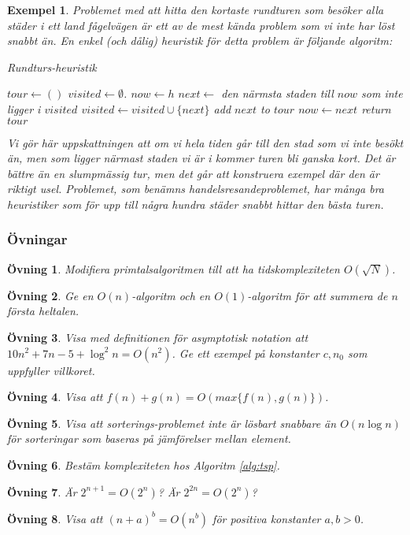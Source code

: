 \documentclass[10pt,a4paper]{article}
\theoremstyle{problem}
\newtheorem{exercise}{Övning}
\newtheorem{example}{Exempel}
\begin{document}
\begin{example}
Problemet med att hitta den kortaste rundturen som besöker alla städer i ett land fågelvägen är ett av de mest kända problem som vi inte har
löst snabbt än. En enkel (och dålig) heuristik för detta problem är följande algoritm:

\begin{algorithm}[H]
\caption{Rundturs-heuristik}\label{alg:tsp}
\begin{algorithmic}[1]
\State $tour \gets ()$
\State $visited \gets \emptyset$.
\State $now \gets h$ 
\State $next \gets $ den närmsta staden till $now$ som inte ligger i $visited$
\State $visited \gets visited\cup \{next\}$
\State add $next$ to $tour$
\State $now \gets next$
\EndWhile
\State return $tour$
\EndProcedure
\end{algorithmic}
\end{algorithm}


Vi gör här uppskattningen att om vi hela tiden går till den stad som vi inte besökt än, men som ligger närmast staden vi är i kommer turen bli ganska kort. Det är bättre
än en slumpmässig tur, men det går att konstruera exempel där den är riktigt usel. Problemet, som benämns \emph{handelsresandeproblemet}, har många bra
heuristiker som för upp till några hundra städer snabbt hittar den bästa turen.

\end{example}

\subsubsection*{Övningar}
\begin{exercise}
Modifiera primtalsalgoritmen till att ha tidskomplexiteten $O(\sqrt{N})$.
\end{exercise}
\begin{exercise}
Ge en $O(n)$-algoritm och en $O(1)$-algoritm för att summera de $n$ första heltalen.
\end{exercise}
\begin{exercise}
Visa med definitionen för asymptotisk notation att $10n^2 + 7n - 5 + \log^2 n = O(n^2)$. Ge ett exempel på konstanter $c, n_0$ som uppfyller villkoret.
\end{exercise}
\begin{exercise}
Visa att $f(n) + g(n) = O(max\{f(n), g(n)\})$.
\end{exercise}
\begin{exercise}
Visa att sorterings-problemet inte är lösbart snabbare än $O(n \log n)$ för sorteringar som baseras på jämförelser mellan element.
\end{exercise}
\begin{exercise}
Bestäm komplexiteten hos Algoritm \ref{alg:tsp}.
\end{exercise}
\begin{exercise}
Är $2^{n+1} = O(2^n)$? Är $2^{2n} = O(2^n)$?
\end{exercise}
\begin{exercise}
Visa att $(n + a)^b = O(n^b)$ för positiva konstanter $a, b > 0$.
\end{exercise}
\end{document}
